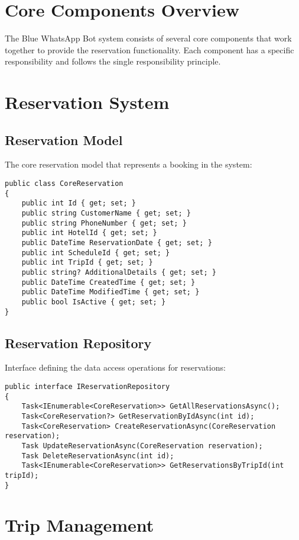 \section{Core Components Overview}
The Blue WhatsApp Bot system consists of several core components that work together to provide the reservation functionality. Each component has a specific responsibility and follows the single responsibility principle.

\section{Reservation System}

\subsection{Reservation Model}
The core reservation model that represents a booking in the system:

\begin{lstlisting}[language=CSharp]
public class CoreReservation
{
    public int Id { get; set; }
    public string CustomerName { get; set; }
    public string PhoneNumber { get; set; }
    public int HotelId { get; set; }
    public DateTime ReservationDate { get; set; }
    public int ScheduleId { get; set; }
    public int TripId { get; set; }
    public string? AdditionalDetails { get; set; }
    public DateTime CreatedTime { get; set; }
    public DateTime ModifiedTime { get; set; }
    public bool IsActive { get; set; }
}
\end{lstlisting}

\subsection{Reservation Repository}
Interface defining the data access operations for reservations:

\begin{lstlisting}[language=CSharp]
public interface IReservationRepository
{
    Task<IEnumerable<CoreReservation>> GetAllReservationsAsync();
    Task<CoreReservation?> GetReservationByIdAsync(int id);
    Task<CoreReservation> CreateReservationAsync(CoreReservation reservation);
    Task UpdateReservationAsync(CoreReservation reservation);
    Task DeleteReservationAsync(int id);
    Task<IEnumerable<CoreReservation>> GetReservationsByTripId(int tripId);
}
\end{lstlisting}

\section{Trip Management}

